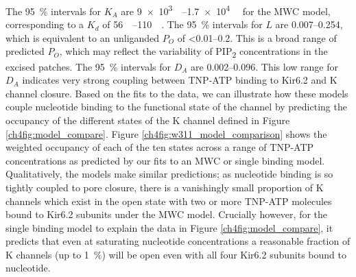 The \SI{95}{\percent} intervals for $K_A$ are \SIrange{9e3}{1.7e4}{\per\Molar} for the MWC model, corresponding to a $K_d$ of \SIrange{56}{110}{\micro\Molar}.
The \SI{95}{\percent} intervals for $L$ are \numrange{.007}{.254}, which is equivalent to an unliganded $P_O$ of \numrange{<0.01}{0.2}.
This is a broad range of predicted $P_O$, which may reflect the variability of PIP\textsubscript{2} concentrations in the excised patches.
The \SI{95}{\percent} intervals for $D_A$ are \numrange{.002}{.096}.
This low range for $D_A$ indicates very strong coupling between TNP-ATP binding to Kir6.2 and K\ATP{} channel closure.
Based on the fits to the data, we can illustrate how these models couple nucleotide binding to the functional state of the channel by predicting the occupancy of the different states of the K\ATP{} channel defined in Figure \ref{ch4fig:model_compare}.
Figure \ref{ch4fig:w311_model_comparison} shows the weighted occupancy of each of the ten states across a range of TNP-ATP concentrations as predicted by our fits to an MWC or single binding model.
Qualitatively, the models make similar predictions; as nucleotide binding is so tightly coupled to pore closure, there is a vanishingly small proportion of K\ATP{} channels which exist in the open state with two or more TNP-ATP molecules bound to Kir6.2 subunits under the MWC model.
Crucially however, for the single binding model to explain the data in Figure \ref{ch4fig:model_compare}, it predicts that even at saturating nucleotide concentrations a reasonable fraction of K\ATP{} channels (up to \SI{1}{\percent}) will be open even with all four Kir6.2 subunits bound to nucleotide.

